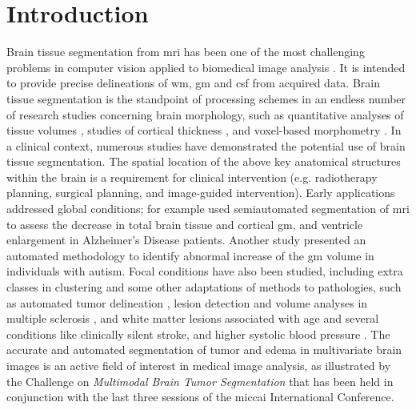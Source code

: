 \section{Introduction}
\label{sec:introduction}
%
Brain tissue segmentation from \gls*{mri} has been one of
  the most challenging problems in computer vision
  applied to biomedical image analysis \citep{kapur_segmentation_1996}.
It is intended to provide precise delineations of \gls*{wm}, \gls*{gm}
  and \gls*{csf} from acquired data.
Brain tissue segmentation is the standpoint of processing schemes in an
  endless number of research studies concerning brain morphology,
  such as quantitative analyses of tissue volumes 
  \citep{mortamet_effects_2005,abe_sex_2010,taki_correlations_2011},
  studies of cortical thickness \citep{fischl_measuring_2000,jones_three-dimensional_2000,
  macdonald_automated_2000}, and voxel-based morphometry
  \citep{wright_voxel-based_1995,paus_structural_1999,
  good_voxel-based_2001,ge_age-related_2002}.
In a clinical context, numerous studies have demonstrated the
  potential use of brain tissue segmentation.
The spatial location of the above key anatomical structures within
  the brain is a requirement for clinical intervention \citep{kikinis_digital_1996} 
  (e.g. radiotherapy planning, surgical planning, and image-guided intervention).
Early applications addressed global conditions; for example \citep{tanabe_tissue_1997}
  used semiautomated segmentation of \gls*{mri} to assess the decrease in 
  total brain tissue and cortical \gls*{gm}, and ventricle enlargement in Alzheimer's
  Disease patients.
Another study \citep{hazlett_cortical_2006} presented an automated methodology
  to identify abnormal increase of the \gls*{gm} volume in individuals
  with autism.
Focal conditions have also been studied, including extra classes in clustering and
  some other adaptations of methods to pathologies, such as automated tumor delineation
  \citep{prastawa_automatic_2003}, lesion detection and volume analyses
  in multiple sclerosis \citep{collins_automated_2001,
  zijdenbos_automatic_1998,zijdenbos_automatic_2002,van_leemput_automated_2001,
  van_leemput_unifying_2003}, and white matter lesions associated
  with age and several conditions like clinically silent stroke, and higher
  systolic blood pressure \citep{anbeek_probabilistic_2004}.
The accurate and automated segmentation of tumor and
  edema in multivariate brain images is an active field of interest in medical
  image analysis, as illustrated by the Challenge on \emph{Multimodal
  Brain Tumor Segmentation} \citep{menze_multimodal_2014} that has been 
  held in conjunction with the last three sessions of the 
  \gls*{miccai} International Conference.

